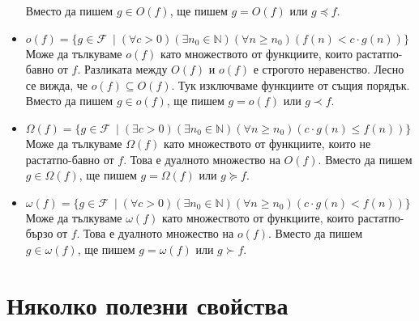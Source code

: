 \documentclass{article}
\newcommand{\N}{\mathbb{N}}
\newcommand{\F}{\mathcal{F}}
\theoremstyle{definition}
\theoremstyle{plain}
\theoremstyle{remark}
\theoremstyle{definition}
\begin{document}
\begin{itemize}
        Вместо да пишем $g \in O(f)$, ще пишем $g = O(f)$ или $g \preceq f$.
  \item $o(f) = \{ g \in \F \: \mid (\forall c > 0)(\exists n_0 \in \N)(\forall n \geq n_0)(f(n) < c \cdot g(n))\}$ \\
        Може да тълкуваме $o(f)$ като множеството от функциите, които растат\footnotemark[1] по-бавно от $f$.
        Разликата между $O(f)$ и $o(f)$ е строгото неравенство.
        Лесно се вижда, че $o(f) \subseteq O(f)$.
        Тук изключваме функциите от същия порядък.
        Вместо да пишем $g \in o(f)$, ще пишем $g = o(f)$ или $g \prec f$.
  \item $\Omega(f) = \{ g \in \F \: \mid (\exists c > 0)(\exists n_0 \in \N)(\forall n \geq n_0)(c \cdot g(n) \leq f(n))\}$ \\
        Може да тълкуваме $\Omega(f)$ като множеството от функциите, които не растат\footnotemark[1] по-бавно от $f$.
        Това е дуалното множество на $O(f)$.
        Вместо да пишем $g \in \Omega(f)$, ще пишем $g = \Omega(f)$ или $g \succeq f$.
  \item $\omega(f) = \{ g \in \F \: \mid (\forall c > 0)(\exists n_0 \in \N)(\forall n \geq n_0)(c \cdot g(n) < f(n))\}$ \\
        Може да тълкуваме $\omega(f)$ като множеството от функциите, които растат\footnotemark[1] по-бързо от $f$.
        Това е дуалното множество на $o(f)$.
        Вместо да пишем $g \in \omega(f)$, ще пишем $g = \omega(f)$ или $g \succ f$.
\end{itemize}

\section*{Няколко полезни свойства}
\end{document}
